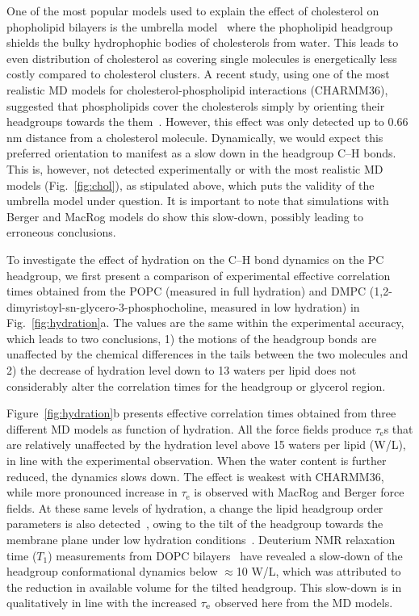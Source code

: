 \documentclass[journal=jpcbfk,manuscript=article,layout=twocolumn]{achemso}
\begin{document}
One of the most popular models used to explain the effect of cholesterol on phopholipid bilayers is the umbrella model~\cite{huang99} where the phopholipid headgroup shields the bulky hydrophophic bodies of cholesterols from water. This leads to even distribution of cholesterol as covering single molecules is energetically less costly compared to cholesterol clusters. A recent study, using one of the most realistic MD models for cholesterol-phospholipid interactions (CHARMM36\cite{botan15}), suggested that phospholipids cover the cholesterols simply by orienting their headgroups towards the them~\cite{leeb18}. However, this effect was only detected up to 0.66 nm distance from a cholesterol molecule. Dynamically, we would expect this preferred orientation to manifest as a slow down in the headgroup C--H bonds. This is, however, not detected experimentally or with the most realistic MD models (Fig.~\ref{fig:chol}), as stipulated above, which puts the validity of the umbrella model under question. It is important to note that simulations with Berger and MacRog models do show this slow-down, possibly leading to erroneous conclusions.

To investigate the effect of hydration on the C--H bond dynamics on the PC headgroup, we first present a comparison of experimental effective correlation times obtained from the POPC (measured in full hydration) and DMPC (1,2-dimyristoyl-sn-glycero-3-phosphocholine, measured in low hydration) in Fig.~\ref{fig:hydration}a. The values are the same within the experimental accuracy, which leads to two conclusions, 1) the motions of the headgroup bonds are unaffected by the chemical differences in the tails between the two molecules and 2) the decrease of hydration level down to 13 waters per lipid does not considerably alter the correlation times for the headgroup or glycerol region. 

Figure~\ref{fig:hydration}b presents effective correlation times obtained from three different MD models as function of hydration. All the force fields produce $\tau_\mathrm{e}$s that are relatively unaffected by the hydration level above 15 waters per lipid (W/L), in line with the experimental observation. When the water content is further reduced, the dynamics slows down. The effect is weakest with CHARMM36, while more  pronounced increase in $\tau_\mathrm{e}$ is observed with MacRog and Berger force fields. At these same levels of hydration, a change the lipid headgroup order parameters is also detected~\cite{botan15}, owing to the tilt of the headgroup towards the membrane plane under low hydration conditions~\cite{bechinger91}. Deuterium NMR relaxation time ($T_{1}$) measurements from DOPC bilayers~\cite{ulrich94} have revealed a slow-down of the headgroup conformational dynamics below $\approx$10 W/L, which was attributed to the reduction in available volume for the tilted headgroup. This slow-down is in qualitatively in line with the increased $\tau_{\rm{e}}$ observed here from the MD models. 
\end{document}
